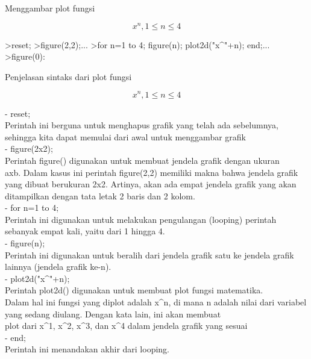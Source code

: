 \documentclass[a4paper,10pt]{article}
\begin{document}
\begin{eulernotebook}
\begin{eulercomment}
\begin{eulercomment}
\begin{eulercomment}
\begin{eulercomment}
\begin{eulercomment}
\begin{eulercomment}
\begin{eulercomment}
Menggambar plot fungsi\\
\end{eulercomment}
\begin{eulerformula}
\[
x^n, 1 \leq n \leq 4
\]
\end{eulerformula}
\begin{eulerprompt}
>reset;
>figure(2,2);...
>for n=1 to 4; figure(n); plot2d("x^"+n); end;...
>figure(0):
\end{eulerprompt}
\begin{eulercomment}
Penjelasan sintaks dari plot fungsi

\end{eulercomment}
\begin{eulerformula}
\[
x^n,  1 \leq n \leq 4
\]
\end{eulerformula}
\begin{eulercomment}
- reset;\\
Perintah ini berguna untuk menghapus grafik yang telah ada sebelumnya,
sehingga kita dapat memulai dari awal untuk menggambar grafik\\
- figure(2x2);\\
Perintah figure() digunakan untuk membuat jendela grafik dengan ukuran\\
axb. Dalam kasus ini perintah figure(2,2) memiliki makna bahwa jendela
grafik yang dibuat berukuran 2x2. Artinya, akan ada empat jendela
grafik yang akan ditampilkan dengan tata letak 2 baris dan 2 kolom.\\
- for n=1 to 4;\\
Perintah ini digunakan untuk melakukan pengulangan (looping) perintah
sebanyak empat kali, yaitu dari 1 hingga 4.\\
- figure(n);\\
Perintah ini digunakan untuk beralih dari jendela grafik satu ke
jendela grafik lainnya (jendela grafik ke-n).\\
- plot2d("x\textasciicircum{}"+n);\\
Perintah plot2d() digunakan untuk membuat plot fungsi matematika.\\
Dalam hal ini fungsi yang diplot adalah x\textasciicircum{}n, di mana n adalah nilai
dari variabel yang sedang diulang. Dengan kata lain, ini akan membuat\\
plot dari x\textasciicircum{}1, x\textasciicircum{}2, x\textasciicircum{}3, dan x\textasciicircum{}4 dalam jendela grafik yang sesuai\\
- end;\\
Perintah ini menandakan akhir dari looping.\\

\end{eulercomment}
\end{eulercomment}
\end{eulercomment}
\end{eulercomment}
\end{eulercomment}
\end{eulercomment}
\end{eulercomment}
\end{eulernotebook}
\end{document}
